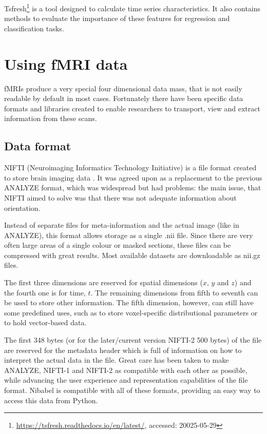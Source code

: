 	Tsfresh\footnote{\url{https://tsfresh.readthedocs.io/en/latest/}, accessed: 20025-05-29} is a tool designed to calculate time series characteristics. It also contains methods to evaluate the importance of these features for regression and classification tasks.
	
	
\section{Using fMRI data}

	fMRIs produce a very special four dimensional data mass, that is not easily readable by default in most cases. Fortunately there have been specific data formats and libraries created to enable researchers to transport, view and extract information from these scans.

	\subsection{Data format}
	
	NIFTI (Neuroimaging Informatics Technology Initiative) is a file format created to store brain imaging data \cite{nifti}. It was agreed upon as a replacement to the previous ANALYZE format, which was widespread but had problems: the main issue, that NIFTI aimed to solve was that there was not adequate information about orientation.
	
	Instead of separate files for meta-information and the actual image (like in ANALYZE), this format allows storage as a single .nii file. Since there are very often large areas of a single colour or masked sections, these files can be compressed with great results. Most available datasets are downloadable as nii.gz files.
	
	The first three dimensions are reserved for spatial dimensions ($x$, $y$ and $z$) and the fourth one is for time, $t$. The remaining dimensions from fifth to seventh can be used to store other information. The fifth dimension, however, can still have some predefined uses, such as to store voxel-specific distributional parameters or to hold vector-based data. 
	
	The first 348 bytes (or for the later/current version NIFTI-2 500 bytes) of the file are reserved for the metadata header which is full of information on how to interpret the actual data in the file. Great care has been taken to make ANALYZE, NIFTI-1 and NIFTI-2 as compatible with each other as possible, while advancing the user experience and representation capabilities of the file format. Nibabel is compatible with all of these formats, providing an easy way to access this data from Python.
	
